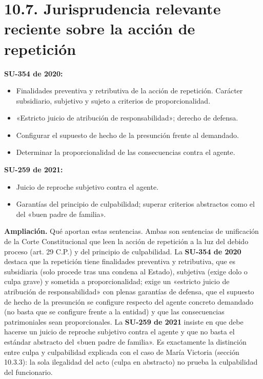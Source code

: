 \section{10.7. Jurisprudencia relevante reciente sobre la acción de repetición}
\textbf{SU-354 de 2020:}

\begin{itemize}
\item Finalidades preventiva y retributiva de la acción de repetición. Carácter subsidiario, subjetivo y sujeto a criterios de proporcionalidad.
\item «Estricto juicio de atribución de responsabilidad»; derecho de defensa.
\item Configurar el supuesto de hecho de la presunción frente al demandado.
\item Determinar la proporcionalidad de las consecuencias contra el agente.
\end{itemize}
\textbf{SU-259 de 2021:}

\begin{itemize}
\item Juicio de reproche subjetivo contra el agente.
\item Garantías del principio de culpabilidad; superar criterios abstractos como el del «buen padre de familia».
\end{itemize}
\begin{ampliacion}
\textcolor[HTML]{5B3F8C}{\textbf{Ampliación. }}Qué aportan estas sentencias. Ambas son sentencias de unificación de la Corte Constitucional que leen la acción de repetición a la luz del debido proceso (art. 29 C.P.) y del principio de culpabilidad. La \textbf{SU-354 de 2020} destaca que la repetición tiene finalidades preventiva y retributiva, que es subsidiaria (solo procede tras una condena al Estado), subjetiva (exige dolo o culpa grave) y sometida a proporcionalidad; exige un «estricto juicio de atribución de responsabilidad» con plenas garantías de defensa, que el supuesto de hecho de la presunción se configure respecto del agente concreto demandado (no basta que se configure frente a la entidad) y que las consecuencias patrimoniales sean proporcionales. La \textbf{SU-259 de 2021} insiste en que debe hacerse un juicio de reproche subjetivo contra el agente y que no basta el estándar abstracto del «buen padre de familia». Es exactamente la distinción entre culpa y culpabilidad explicada con el caso de María Victoria (sección 10.3.3): la sola ilegalidad del acto (culpa en abstracto) no prueba la culpabilidad del funcionario.
\end{ampliacion}
